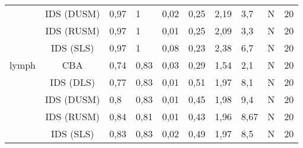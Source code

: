 \begin{tabular}{ccllllllll}
      & IDS (DUSM) &               0,97 &                               1 &                            0,02 &                              0,25 &                              2,19 &                           3,7 &                            N &                         20 \\
      & IDS (RUSM) &               0,97 &                               1 &                            0,01 &                              0,25 &                              2,09 &                           3,3 &                            N &                         20 \\
      & IDS (SLS) &               0,97 &                               1 &                            0,08 &                              0,23 &                              2,38 &                           6,7 &                            N &                         20 \\
lymph & CBA &               0,74 &                            0,83 &                            0,03 &                              0,29 &                              1,54 &                           2,1 &                            N &                         20 \\
      & IDS (DLS) &               0,77 &                            0,83 &                            0,01 &                              0,51 &                              1,97 &                           8,1 &                            N &                         20 \\
      & IDS (DUSM) &                0,8 &                            0,83 &                            0,01 &                              0,45 &                              1,98 &                           9,4 &                            N &                         20 \\
      & IDS (RUSM) &               0,84 &                            0,81 &                            0,01 &                              0,43 &                              1,96 &                          8,67 &                            N &                         20 \\
      & IDS (SLS) &               0,83 &                            0,83 &                            0,02 &                              0,49 &                              1,97 &                           8,5 &                            N &                         20 \\
\bottomrule
\end{tabular}
